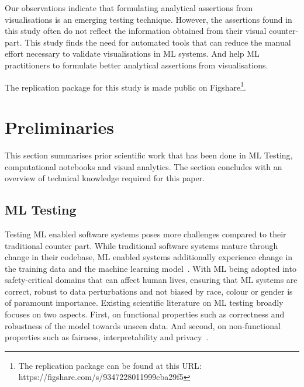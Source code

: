 \documentclass[conference]{IEEEtran}
\begin{document}
Our observations indicate that formulating analytical assertions from visualisations is an emerging testing technique. However, the assertions found in this study often do not reflect the information obtained from their visual counter-part. This study finds the need for automated tools that can reduce the manual effort necessary to validate visualisations in ML systems. And help ML practitioners to formulate better analytical assertions from visualisations.

The replication package for this study is made public on Figshare\footnote{The replication package can be found at this URL: https://figshare.com/s/9347228011999cba29f5}.

\section{Preliminaries}\label{sec:prelim}

This section summarises prior scientific work that has been done in ML Testing, computational notebooks and visual analytics. The section concludes with an overview of technical knowledge required for this paper.

\subsection{ML Testing}\label{sec:ml-testing}

Testing ML enabled software systems poses more challenges compared to their traditional counter part. While traditional software systems mature through change in their codebase, ML enabled systems additionally experience change in the training data and the machine learning model~\cite{sculley2015hidden,amershi2019software,sambasivan2021everyone}. With ML being adopted into safety-critical domains that can affect human lives, ensuring that ML systems are correct, robust to data perturbations and not biased by race, colour or gender is of paramount importance. Existing scientific literature on ML testing broadly focuses on two aspects. First, on functional properties such as correctness and robustness of the model towards unseen data. And second, on non-functional properties such as fairness, interpretability and privacy~\cite{zhang2020machine,mehrabi2021survey,chen2022fairness}.
\end{document}
